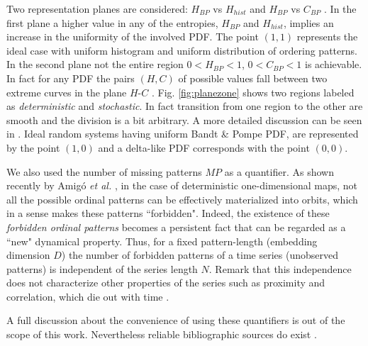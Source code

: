 Two representation planes are considered: $H_{BP}$ vs $H_{hist}$ \cite{DeMicco2008} and $H_{BP}$ vs $C_{BP}$ \cite{Rosso2007C}.
In the first plane a higher value in any of the entropies, $H_{BP}$ and $H_{hist}$, implies an increase in the uniformity of the involved PDF.
The point $(1,1)$ represents the ideal case with uniform histogram and uniform distribution of ordering patterns.
In the second plane not the entire region $0<H_{BP}<1$, $0<C_{BP}<1$ is achievable.
In fact for any PDF the pairs $(H,C)$ of possible values fall between two extreme curves in the plane $H$-$C$ \cite{Anteneodo1996}.
Fig. \ref{fig:planezone} shows two regions labeled as \textit{deterministic} and \textit{stochastic}.
In fact transition from one region to the other are smooth and the division is a bit arbitrary.
A more detailed discussion can be seen in \cite{Rosso2007C}.
Ideal random systems having uniform Bandt \& Pompe PDF, are represented by the point $(1,0)$ \cite{Gonzalez2005} and a delta-like PDF corresponds with the point $(0,0)$.

We also used the number of missing patterns $MP$ as a quantifier\cite{Rosso2012}.
As shown recently by Amig\'o {\it et al.} \cite{Amigo2006,Amigo2007,Amigo2008,Amigo2010}, in the case of deterministic one-dimensional maps, not all the possible ordinal patterns can be effectively materialized into orbits, which in a sense makes these patterns ``forbidden".
Indeed, the existence of these {\it forbidden ordinal patterns} becomes a persistent fact that can be regarded as a ``new" dynamical property.
Thus, for a fixed pattern-length (embedding dimension $D$) the number of forbidden patterns of a time series (unobserved patterns) is independent of the series length $N$.
Remark that this independence does not characterize other properties of the series such as proximity and correlation, which die out with time \cite{Amigo2007,Amigo2010}.

A full discussion about the convenience of using these quantifiers is out of the scope of this work.
Nevertheless reliable bibliographic sources do exist \cite{Wackerbauer1994,Lopez1995,Rosso2007A,DeMicco2008,Rosso2009,Martin2006,Rosso2012}.
